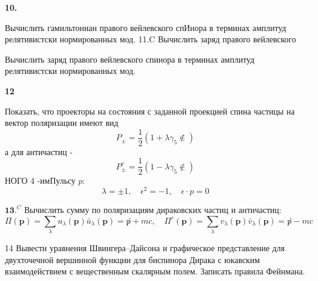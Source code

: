\documentclass[a4paper,12pt]{article} %
\begin{document}
\begin{ttask} \textbf{10.}
	
	 
Вычислить гамильтониан правого вейлевского спИнора в терминах амплитуд релятивистски нормированных мод. 11.C 
Вычислить заряд правого вейлевского 



\end{ttask}



\begin{ttask}

Вычислить заряд правого вейлевского спинора в терминах амплитуд релятивистски нормированных мод.





\end{ttask}



\begin{ttask} \textbf{12} 

Показать, что проекторы на состояния с заданной проекцией
спина частицы на вектор поляризации имеют вид
$$
P_{\pm}=\frac{1}{2}\left(1+\lambda \gamma_{5} \notin\right)
$$
а для античастиц -
$$
P_{\pm}^{c}=\frac{1}{2}\left(1-\lambda \gamma_{5} \notin\right)
$$
НОГО 4 -имПульсу $p:$
$$
\lambda=\pm 1, \quad \epsilon^{2}=-1, \quad \epsilon \cdot p=0
$$


\end{ttask}



\begin{ttask}


$\mathbf{1 3 .}^{C}$ Вычислить сумму по поляризациям дираковских частиц и античастиц:
$$
\Pi(\boldsymbol{p})=\sum_{\lambda} u_{\lambda}(\boldsymbol{p}) \bar{u}_{\lambda}(\boldsymbol{p})=\not p+m c, \quad \Pi^{c}(\boldsymbol{p})=\sum_{\lambda} v_{\lambda}(\boldsymbol{p}) \bar{v}_{\lambda}(\boldsymbol{p})=\not p-m c
$$


\end{ttask}






\begin{ttask}

14 Вывести уравнения Швингера–Дайсона и графическое представление для двухточечной вершинной функции для биспинора Дирака с юкавским взаимодействием с вещественным скалярным полем. Записать правила Фейнмана.


\end{ttask}
\end{document}
